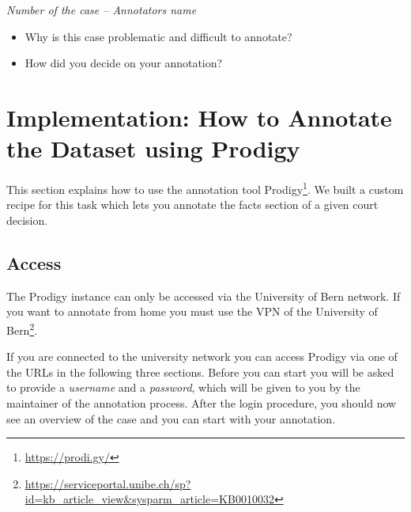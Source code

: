 \documentclass{article}
\begin{document}
\begin{mdframed}[frametitle={Comment for generally problematic case}]
\emph{Number of the case – Annotators name}

\begin{itemize}
	\item Why is this case problematic and difficult to annotate?

\item How did you decide on your annotation?
\end{itemize}
\end{mdframed}

\section{Implementation: How to Annotate the Dataset using Prodigy}
This section explains how to use the annotation tool Prodigy\footnote{\href{https://prodi.gy/}{https://prodi.gy/}}. We built a custom recipe for this task which lets you annotate the facts section of a given court decision.

\subsection{Access}
The Prodigy instance can only be accessed via the University of Bern network. If you want to annotate from home you must use the VPN of the University of Bern\footnote{\href{https://serviceportal.unibe.ch/sp?id=kb_article_view&sysparm_article=KB0010032}{https://serviceportal.unibe.ch/sp?id=kb_article_view&sysparm_article=KB0010032}}.

If you are connected to the university network you can access Prodigy via one of the URLs in the following three sections. Before you can start you will be asked to provide a \emph{username} and a \emph{password}, which will be given to you by the maintainer of the annotation process. After the login procedure, you should now see an overview of the case and you can start with your annotation.
\end{document}

